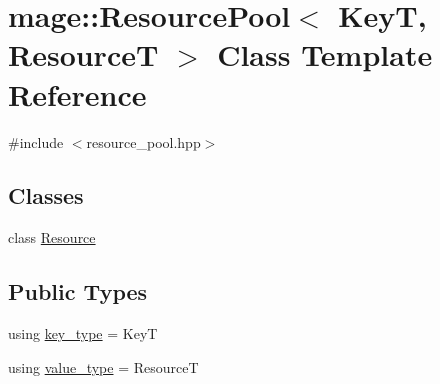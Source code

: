 \hypertarget{classmage_1_1_resource_pool}{}\section{mage\+:\+:Resource\+Pool$<$ KeyT, ResourceT $>$ Class Template Reference}
\label{classmage_1_1_resource_pool}


{\ttfamily \#include $<$resource\+\_\+pool.\+hpp$>$}

\subsection*{Classes}
\begin{DoxyCompactItemize}
\item 
class \mbox{\hyperlink{classmage_1_1_resource_pool_1_1_resource}{Resource}}
\end{DoxyCompactItemize}
\subsection*{Public Types}
\begin{DoxyCompactItemize}
\item 
using \mbox{\hyperlink{classmage_1_1_resource_pool_adef3060db9bd6ffd8f46abd35afebae5}{key\+\_\+type}} = KeyT
\item 
using \mbox{\hyperlink{classmage_1_1_resource_pool_a5297ef9d8f854a606391ace5a9746a85}{value\+\_\+type}} = ResourceT
\end{DoxyCompactItemize}
